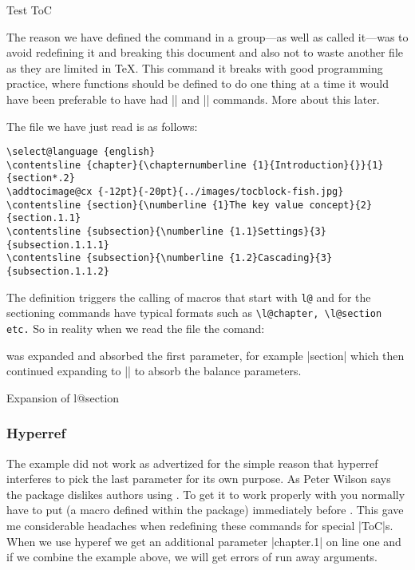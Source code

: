 \begin{texexample}{Test ToC}{}
\makeatletter
{} 
\begingroup
\def\@starttoc#1{
    \@input{\jobname.#1}
    \@nobreakfalse}
\@starttoc{tst}  
\endgroup
\makeatother
\end{texexample}

The reason we have defined the command in a group---as well as called it---was to avoid redefining it and breaking this document and also not to waste another file as they are limited in TeX. This command it breaks with good programming practice, where functions should be defined to do one thing at a time it would have been preferable to have had |\@readtoc| and  |\@writetoc| commands. More about this later.

The file we have just read is as follows:

\begin{verbatim}
\select@language {english}
\contentsline {chapter}{\chapternumberline {1}{Introduction}{}}{1}{section*.2}
\addtocimage@cx {-12pt}{-20pt}{../images/tocblock-fish.jpg}
\contentsline {section}{\numberline {1}The key value concept}{2}{section.1.1}
\contentsline {subsection}{\numberline {1.1}Settings}{3}{subsection.1.1.1}
\contentsline {subsection}{\numberline {1.2}Cascading}{3}{subsection.1.1.2}
\end{verbatim}

The  definition triggers the calling of macros that start with \verb+l@+ and for the sectioning commands have typical formats such as \lstinline{\l@chapter, \l@section etc.} So in reality when we read the
file the comand:
\begin{teX}
\def\contentsline#1{\csname l@#1\endcsname}
\end{teX}
was expanded and absorbed the first parameter, for example |{section}| which then continued expanding to |\l@section| to absorb the balance parameters.

\begin{texexample}{Expansion of l@section}{}
\makeatletter
{}
\makeatother
\end{texexample}

\subsubsection{Hyperref}

The example did not work as advertized for the simple reason that hyperref interferes to pick the last parameter for its own purpose. As Peter Wilson says the  package dislikes authors using
. To get it to work properly with   you normally have to put  (a macro defined within  the  package) immediately  before . This gave me considerable headaches when redefining these commands for special |ToC|s.
When we use hyperef we get an additional parameter |chapter.1| on line one and if we combine the example above, we will get errors of run away arguments.

